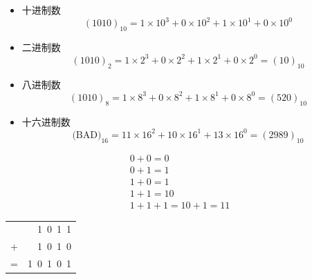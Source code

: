 \begin{frame}

\begin{itemize}
\item 十进制数
\[
(1010)_{10}=1\times10^3+0\times10^2+1\times10^1+0\times10^0
\]
\item 二进制数
\[
(1010)_{2}=1\times2^3+0\times2^2+1\times2^1+0\times2^0=(10)_{10}
\]
\item 八进制数
\[
(1010)_{8}=1\times8^3+0\times8^2+1\times8^1+0\times8^0=(520)_{10}
\]
\item 十六进制数
\[
\mbox{(BAD)}_{16}=11\times16^2+10\times16^1+13\times16^0=(2989)_{10}
\]
\end{itemize}
\end{frame}

\begin{frame}

  \begin{free}[加法法则]{}
    \[
        \begin{array}{l}
          0+0=0\\
          0+1=1\\
          1+0=1\\
          1+1=10\\
          1+1+1=10+1=11
        \end{array}
    \]
  \end{free}

  \begin{exam}{}
    \begin{table}
      \centering
      \begin{tabular}{cD{.}{.}{3}}
        &1~0~1~1\\
        +&1~0~1~0\\
        \hline
        =&1~0~1~0~1
      \end{tabular}
    \end{table}
  \end{exam}
\end{frame}

